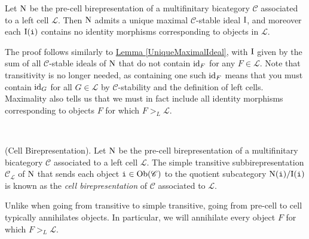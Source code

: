 \noindent\begin{proposition}\label{UniqueMaximalIdealCell} Let $\textup{N}$ be the pre-cell birepresentation of a multifinitary bicategory $\mathscr{C}$ associated to a left cell $\mathcal{L}$. Then $\textup{N}$ admits a unique maximal $\mathscr{C}$-stable ideal $\textup{I}$, and moreover each $\textup{I}(\textnormal{\texttt{i}})$ contains no identity morphisms corresponding to objects in $\mathcal{L}$.\\
\end{proposition}

\noindent\begin{sketch} The proof follows similarly to \hyperref[UniqueMaximalIdeal]{Lemma \ref*{UniqueMaximalIdeal}}, with $\textup{I}$ given by the sum of all $\mathscr{C}$-stable ideals of $\textup{N}$ that do not contain $\textup{id}_F$ for any $F \in \mathcal{L}$. Note that transitivity is no longer needed, as containing one such $\textup{id}_F$ means that you must contain $\textup{id}_G$ for all $G \in \mathcal{L}$ by $\mathscr{C}$-stability and the definition of left cells. Maximality also tells us that we must in fact include all identity morphisms corresponding to objects $F$ for which $F >_L \mathcal{L}$.
\end{sketch}\\

\noindent\begin{definition}\textup{(Cell Birepresentation).} Let $\textup{N}$ be the pre-cell birepresentation of a multifinitary bicategory $\mathscr{C}$ associated to a left cell $\mathcal{L}$. The simple transitive subbirepresentation $\mathscr{C}_\mathcal{L}$ of $\textup{N}$ that sends each object $\textnormal{\texttt{i}} \in \textnormal{Ob}(\mathscr{C})$ to the quotient subcategory $\textup{N}(\textnormal{\texttt{i}})/\textup{I}(\textnormal{\texttt{i}})$ is known as the {\em cell birepresentation} of $\mathscr{C}$ associated to $\mathcal{L}$.\\
\end{definition}

\noindent Unlike when going from transitive to simple transitive, going from pre-cell to cell typically annihilates objects. In particular, we will annihilate every object $F$ for which $F >_L \mathcal{L}$.\newpage

